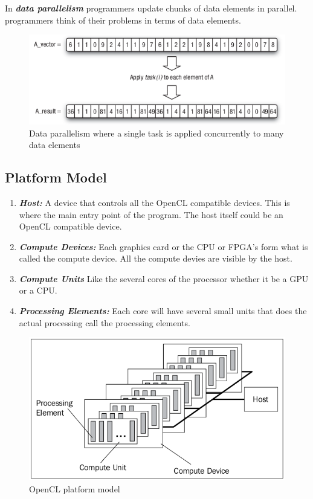 In \textit{\textbf{data parallelism}} programmers update chunks of data elements in parallel. programmers think of their problems in terms of data elements.

\begin{figure}[H]
  \centering
  \includegraphics[scale=0.7]{./images/data_parallelism.png}
  \caption{Data parallelism where a single task is applied concurrently to many data elements}
  \label{data parallelism}
\end{figure}

\subsection{Platform Model}
\begin{enumerate}
	\item \textbf{\textit{Host:}} A device that controls all the OpenCL compatible devices. This is where the main entry point of the program. The host itself could be an OpenCL compatible device.
	\item \textbf{\textit{Compute Devices:}} Each graphics card or the CPU or FPGA's form what is called the compute device. All the compute devies are visible by the host.
	\item \textbf{\textit{Compute Units}} Like the several cores of the processor whether it be a GPU or a CPU. 
	\item \textbf{\textit{Processing Elements:}} Each core will have several small units that does the actual processing call the processing elements.
\end{enumerate}

\begin{figure}[H]
  \centering
  \includegraphics[scale=0.4]{./images/platform_model.png}
  \caption{OpenCL platform model}
  \label{platform_model}
\end{figure}

